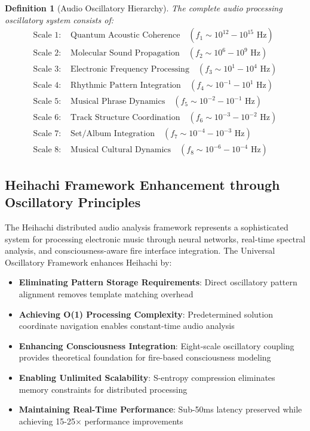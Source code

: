 \documentclass[12pt,a4paper]{article}
\newtheorem{definition}{Definition}
\begin{document}
\begin{definition}[Audio Oscillatory Hierarchy]
The complete audio processing oscillatory system consists of:
\begin{align}
\text{Scale 1: } &\text{Quantum Acoustic Coherence} \quad (f_1 \sim 10^{12}-10^{15} \text{ Hz}) \label{eq:quantum_acoustic} \\
\text{Scale 2: } &\text{Molecular Sound Propagation} \quad (f_2 \sim 10^6-10^9 \text{ Hz}) \label{eq:molecular_sound} \\
\text{Scale 3: } &\text{Electronic Frequency Processing} \quad (f_3 \sim 10^1-10^4 \text{ Hz}) \label{eq:electronic_freq} \\
\text{Scale 4: } &\text{Rhythmic Pattern Integration} \quad (f_4 \sim 10^{-1}-10^1 \text{ Hz}) \label{eq:rhythmic_pattern} \\
\text{Scale 5: } &\text{Musical Phrase Dynamics} \quad (f_5 \sim 10^{-2}-10^{-1} \text{ Hz}) \label{eq:musical_phrase} \\
\text{Scale 6: } &\text{Track Structure Coordination} \quad (f_6 \sim 10^{-3}-10^{-2} \text{ Hz}) \label{eq:track_structure} \\
\text{Scale 7: } &\text{Set/Album Integration} \quad (f_7 \sim 10^{-4}-10^{-3} \text{ Hz}) \label{eq:set_album} \\
\text{Scale 8: } &\text{Musical Cultural Dynamics} \quad (f_8 \sim 10^{-6}-10^{-4} \text{ Hz}) \label{eq:musical_cultural}
\end{align}
\end{definition}

\subsection{Heihachi Framework Enhancement through Oscillatory Principles}

The Heihachi distributed audio analysis framework represents a sophisticated system for processing electronic music through neural networks, real-time spectral analysis, and consciousness-aware fire interface integration. The Universal Oscillatory Framework enhances Heihachi by:

\begin{itemize}
\item \textbf{Eliminating Pattern Storage Requirements}: Direct oscillatory pattern alignment removes template matching overhead
\item \textbf{Achieving O(1) Processing Complexity}: Predetermined solution coordinate navigation enables constant-time audio analysis
\item \textbf{Enhancing Consciousness Integration}: Eight-scale oscillatory coupling provides theoretical foundation for fire-based consciousness modeling
\item \textbf{Enabling Unlimited Scalability}: S-entropy compression eliminates memory constraints for distributed processing
\item \textbf{Maintaining Real-Time Performance}: Sub-50ms latency preserved while achieving 15-25× performance improvements
\end{itemize}
\end{document}
